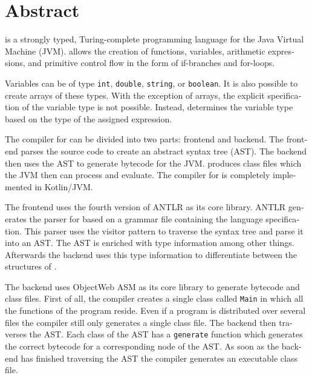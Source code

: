 \chapter{Abstract}

\begin{english} %
\Toya is a strongly typed, Turing-complete programming language for the Java Virtual Machine (JVM). \Toya allows the creation of functions, variables, arithmetic expressions, and primitive control flow in the form of if-branches and for-loops.

Variables can be of type \texttt{int}, \texttt{double}, \texttt{string}, or \texttt{boolean}. It is also possible to create arrays of these types. With the exception of arrays, the explicit specification of the variable type is not possible. Instead, \toya determines the variable type based on the type of the assigned expression.

The compiler for \toya can be divided into two parts: frontend and backend. The frontend parses the source code to create an abstract syntax tree (AST). The backend then uses the AST to generate bytecode for the JVM. \Toya produces class files which the JVM then can process and evaluate. The compiler for \toya is completely implemented in Kotlin/JVM. 

The frontend uses the fourth version of ANTLR as its core library. ANTLR generates the parser for \toya based on a grammar file containing the language specification. This parser uses the visitor pattern to traverse the syntax tree and parse it into an AST. The AST is enriched with type information among other things. Afterwards the backend uses this type information to differentiate between the structures of \toya.

The backend uses ObjectWeb ASM as its core library to generate bytecode and class files. First of all, the compiler creates a single class called \texttt{Main} in which all the functions of the program reside. Even if a \toya program is distributed over several files the compiler still only generates a single class file. The backend then traverses the AST. Each class of the AST has a \texttt{generate} function which generates the correct bytecode for a corresponding node of the AST. As soon as the backend has finished traversing the AST the \toya compiler generates an executable class file.
\end{english}

